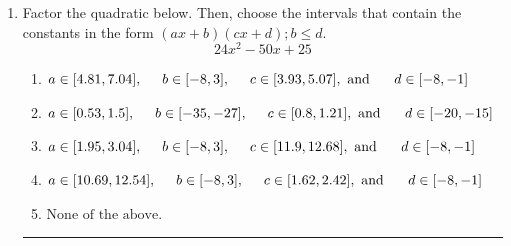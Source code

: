 \documentclass[14pt]{extbook}
\newcommand{\litem}[1]{\item#1\hspace*{-1cm}\rule{\textwidth}{0.4pt}}
\begin{document}
\begin{enumerate}
{\begin{enumerate}[label=\Alph*.]
\end{enumerate} }
\litem{
Factor the quadratic below. Then, choose the intervals that contain the constants in the form $(ax+b)(cx+d); b \leq d.$\[ 24x^{2} -50 x + 25 \]\begin{enumerate}[label=\Alph*.]
\item \( a \in [4.81, 7.04], \hspace*{5mm} b \in [-8, 3], \hspace*{5mm} c \in [3.93, 5.07], \text{ and } \hspace*{5mm} d \in [-8, -1] \)
\item \( a \in [0.53, 1.5], \hspace*{5mm} b \in [-35, -27], \hspace*{5mm} c \in [0.8, 1.21], \text{ and } \hspace*{5mm} d \in [-20, -15] \)
\item \( a \in [1.95, 3.04], \hspace*{5mm} b \in [-8, 3], \hspace*{5mm} c \in [11.9, 12.68], \text{ and } \hspace*{5mm} d \in [-8, -1] \)
\item \( a \in [10.69, 12.54], \hspace*{5mm} b \in [-8, 3], \hspace*{5mm} c \in [1.62, 2.42], \text{ and } \hspace*{5mm} d \in [-8, -1] \)
\item \( \text{None of the above.} \)


\end{enumerate}}
\end{enumerate}
\end{document}
